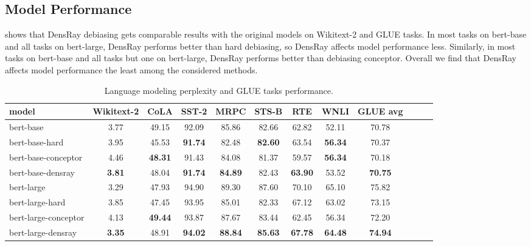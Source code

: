 \subsection{Model Performance}
 shows that DensRay debiasing gets comparable results with
the original models on Wikitext-2 and GLUE tasks.
In most tasks on bert-base and all tasks on bert-large, DensRay performs better than hard debiasing, so DensRay affects model performance less.
Similarly, in most tasks on bert-base and all tasks but one
on bert-large, DensRay performs better than debiasing conceptor. Overall we find that DensRay affects model performance the least among the considered methods.
\begin{table}[h]
\centering
\footnotesize
\vspace{0cm}  
\setlength{\abovecaptionskip}{0.2cm}   
\setlength{\belowcaptionskip}{0cm}
\begin{tabular}{l||c|cccccccccc}
model & Wikitext-2&CoLA &SST-2&MRPC&STS-B&RTE&WNLI&GLUE avg\\
\hline\hline
		bert-base &3.77&49.15&92.09&85.86&82.66&62.82&52.11&70.78\\
bert-base-hard &3.95&45.53&\textbf{91.74}&82.48&\textbf{82.60}&63.54&\textbf{56.34}&70.37\\
bert-base-conceptor &4.46&\textbf{48.31}&91.43&84.08&81.37&59.57&\textbf{56.34}&70.18\\
bert-base-densray &\textbf{3.81}&48.04&\textbf{91.74}&\textbf{84.89}&82.43&\textbf{63.90}&53.52&\textbf{70.75}\\
\hline
bert-large &3.29& 47.93&94.90&89.30&87.60&70.10&65.10&75.82\\
bert-large-hard &3.85& 47.45&93.95&85.01&82.33&67.12&63.02&73.15\\
bert-large-conceptor &4.13&\textbf{49.44}&93.87&87.67&83.44&62.45&56.34&72.20\\
bert-large-densray &\textbf{3.35}& 48.91&\textbf{94.02}&\textbf{88.84}&\textbf{85.63}&\textbf{67.78}&\textbf{64.48}&\textbf{74.94}\\
\end{tabular}
\caption{
Language modeling perplexity and GLUE tasks
performance. }
\end{table}


